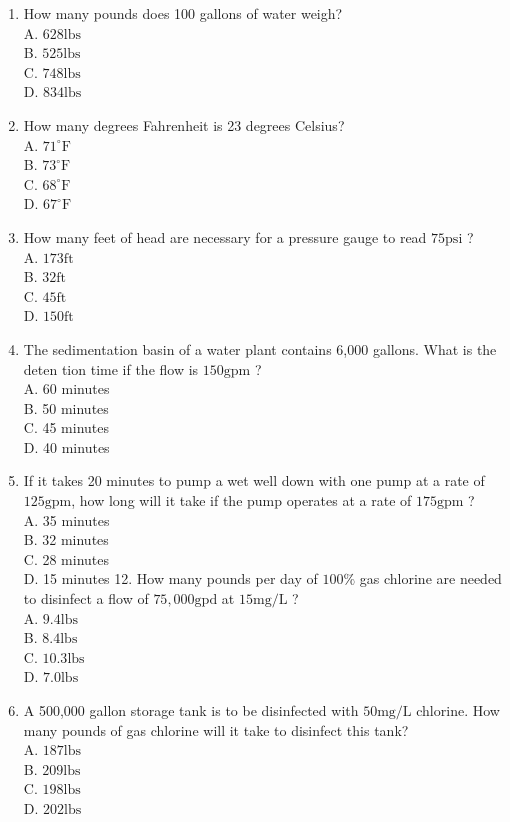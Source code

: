 \documentclass[10pt]{article}
\begin{document}
\begin{enumerate}
  \item How many pounds does 100 gallons of water weigh?\\
A. $628 \mathrm{lbs}$\\
B. $525 \mathrm{lbs}$\\
C. $748 \mathrm{lbs}$\\
D. $834 \mathrm{lbs}$

  \item How many degrees Fahrenheit is 23 degrees Celsius?\\
A. $71^{\circ} \mathrm{F}$\\
B. $73^{\circ} \mathrm{F}$\\
C. $68^{\circ} \mathrm{F}$\\
D. $67^{\circ} \mathrm{F}$

  \item How many feet of head are necessary for a pressure gauge to read $75 \mathrm{psi}$ ?\\
A. $173 \mathrm{ft}$\\
B. $32 \mathrm{ft}$\\
C. $45 \mathrm{ft}$\\
D. $150 \mathrm{ft}$

  \item The sedimentation basin of a water plant contains 6,000 gallons. What is the deten tion time if the flow is $150 \mathrm{gpm}$ ?\\
A. 60 minutes\\
B. 50 minutes\\
C. 45 minutes\\
D. 40 minutes

  \item If it takes 20 minutes to pump a wet well down with one pump at a rate of $125 \mathrm{gpm}$, how long will it take if the pump operates at a rate of $175 \mathrm{gpm}$ ?\\
A. 35 minutes\\
B. 32 minutes\\
C. 28 minutes\\
D. 15 minutes 12. How many pounds per day of $100 \%$ gas chlorine are needed to disinfect a flow of $75,000 \mathrm{gpd}$ at $15 \mathrm{mg} / \mathrm{L}$ ?\\
A. $9.4 \mathrm{lbs}$\\
B. $8.4 \mathrm{lbs}$\\
C. $10.3 \mathrm{lbs}$\\
D. $7.0 \mathrm{lbs}$

  \item A 500,000 gallon storage tank is to be disinfected with $50 \mathrm{mg} / \mathrm{L}$ chlorine. How many pounds of gas chlorine will it take to disinfect this tank?\\
A. $187 \mathrm{lbs}$\\
B. $209 \mathrm{lbs}$\\
C. $198 \mathrm{lbs}$\\
D. $202 \mathrm{lbs}$


\end{enumerate}
\end{document}
